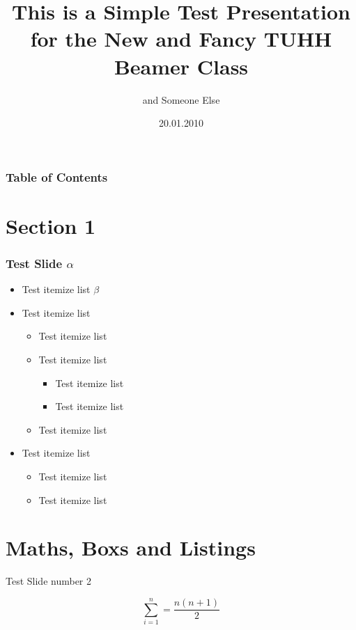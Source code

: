 \documentclass[
  en, %
  inputenc=utf8,
]{tuhhslides}
\title{This is a Simple Test Presentation for the New and Fancy TUHH Beamer Class}
\author[Christian Renner]{\speaker{Christian Renner} and Someone Else}
\date{20.01.2010}
\begin{document}
\begin{frame}
    \titlepage
\end{frame}


\begin{frame}
    \frametitle{Table of Contents}
    \tableofcontents
\end{frame}


\section{Section 1}

\begin{frame}
  \frametitle{Test Slide $\alpha$}

  \begin{itemize}
    \item Test itemize list $\beta$
    \item Test itemize list
    \begin{itemize}
      \item<2-> Test itemize list
      \item Test itemize list
      \begin{itemize}
        \item<3-> Test itemize list
        \item Test itemize list
      \end{itemize}
      \item Test itemize list
    \end{itemize}
    \item Test itemize list
    \begin{itemize}
      \item Test itemize list
      \item Test itemize list
    \end{itemize}
  \end{itemize}
\end{frame}


\section{Maths, Boxs and Listings}

\begin{frame}{Test Slide number 2}

  \begin{definition}
    \[ \sum_{i=1}^{n} = \frac{n (n+1)}{2} \]
  \end{definition}
 
\end{frame}
\end{document}
